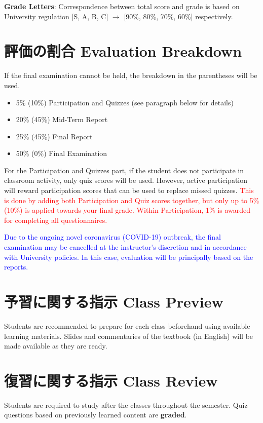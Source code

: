 \documentclass[a4paper]{article}
\begin{document}
\smallskip\noindent
\textbf{Grade Letters}: Correspondence between total score and grade is based on University regulation [S, A, B, C] $\rightarrow$ [90\%, 80\%, 70\%, 60\%] respectively.

\section{評価の割合 Evaluation Breakdown}
If the final examination cannot be held, the breakdown in the parentheses will be used.

\begin{itemize}
    \item 5\% (10\%) Participation and Quizzes (see paragraph below for details)
    \item 20\% (45\%) Mid-Term Report
    \item 25\% (45\%) Final Report
    \item 50\% (0\%) Final Examination
\end{itemize}

For the Participation and Quizzes part, if the student does not participate in classroom activity, only quiz scores will be used. However, active participation will reward participation scores that can be used to replace missed quizzes. \textcolor{red}{This is done by adding both Participation and Quiz scores together, but only up to 5\% (10\%) is applied towards your final grade. Within Participation, 1\% is awarded for completing all questionnaires.}

\textcolor{blue}{Due to the ongoing novel coronavirus (COVID-19) outbreak, the final examination may be cancelled at the instructor's discretion and in accordance with University policies. In this case, evaluation will be principally based on the reports.}

\section{予習に関する指示 Class Preview}
Students are recommended to prepare for each class beforehand using available learning materials. Slides and commentaries of the textbook (in English) will be made available as they are ready.

\section{復習に関する指示 Class Review}
Students are required to study after the classes throughout the semester. Quiz questions based on previously learned content are \textbf{graded}.
\end{document}
